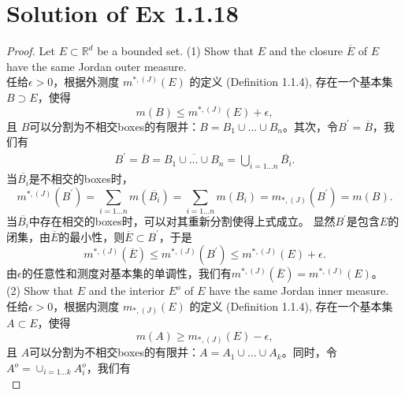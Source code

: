 \documentclass[reqno,a4paper,14pt]{amsart}
\begin{document}
\section{Solution of Ex 1.1.18}
\begin{proof}
    Let $E\subset \mathbb{R}^d$ be a bounded set. (1) Show that $E$ and the closure $\overline{E}$ of $E$ have the same Jordan outer measure.\\

    任给$\epsilon>0$，根据外测度 $m^{*,(J)}(E)$ 的定义 (Definition 1.1.4), 存在一个基本集$B\supset E$，使得
    \begin{equation*}
        m(B)\leq m^{*,(J)}(E)+\epsilon,
    \end{equation*}
    且 $B$可以分割为不相交boxes的有限并：$B=B_1\cup\dots \cup B_n$。其次，令$B^\prime=\overline{B}$，我们有
    \begin{equation*}
        \begin{split}
            B^\prime=\overline{B}=\overline{B_1\cup\dots \cup B_n}=\bigcup_{i=1...n} \overline{B_i}.
        \end{split}
    \end{equation*}
    当$\overline{B_i}$是不相交的boxes时，
    \begin{equation*}
        m^{*,(J)}(B^\prime)=\sum_{i=1...n}m(\overline{B_i})=\sum_{i=1...n}m(B_i)=m_{*,(J)}(B^\prime)=m(B).
    \end{equation*}
    当$\overline{B_i}$中存在相交的boxes时，可以对其重新分割使得上式成立。
    显然$B^\prime$是包含$E$的闭集，由$\overline{E}$的最小性，则$\overline{E}\subset B^\prime$，于是
    \begin{equation*}
        m^{*,(J)}(\overline{E})\leq m^{*,(J)}(B^\prime)\leq m^{*,(J)}(E)+\epsilon.
    \end{equation*}
    由$\epsilon$的任意性和测度对基本集的单调性，我们有$m^{*,(J)}(\overline{E})=m^{*,(J)}(E)$。\\
    (2) Show that $E$ and the interior $E^o$ of $E$ have the same Jordan inner measure.\\
    \newline
    任给$\epsilon>0$，根据内测度 $m_{*,(J)}(E)$ 的定义 (Definition 1.1.4), 存在一个基本集$A\subset E$，使得
    \begin{equation*}
        m(A)\geq m_{*,(J)}(E)-\epsilon,
    \end{equation*}
    且 $A$可以分割为不相交boxes的有限并：$A=A_1\cup\dots \cup A_k$。同时，令$A^o=\cup_{i=1...k}A_i^o$，我们有
    \begin{equation*}

\end{equation*}
\end{proof}
\end{document}
